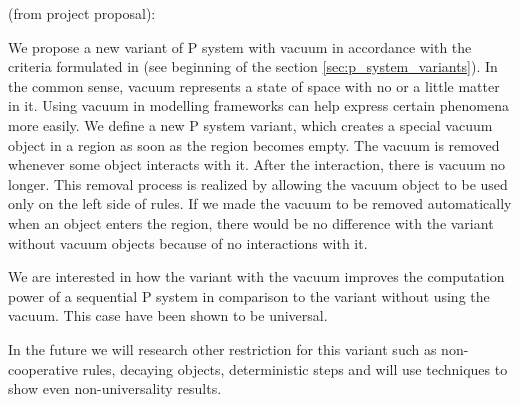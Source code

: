 (from project proposal):

We propose a new variant of P system with vacuum in accordance with the criteria formulated in \cite{Besozzi:PhD:2004} (see beginning of the section \ref{sec:p_system_variants}). In the common sense, vacuum represents a state of space with no or a little matter in it. Using vacuum in modelling frameworks can help express certain phenomena more easily. We define a new P system variant, which creates a special vacuum object in a region as soon as the region becomes empty. The vacuum is removed whenever some object interacts with it. After the interaction, there is vacuum no longer. This removal process is realized by allowing the vacuum object to be used only on the left side of rules. If we made the vacuum to be removed automatically when an object enters the region, there would be no difference with the variant without vacuum objects because of no interactions with it.

We are interested in how the variant with the vacuum improves the computation power of a sequential P system in comparison to the variant without using the vacuum. This case have been shown to be universal.

In the future we will research other restriction for this variant such as non-cooperative rules, decaying objects, deterministic steps and will use techniques to show even non-universality results.

